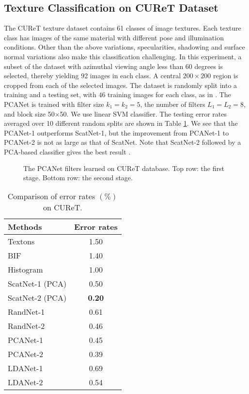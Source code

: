 \documentclass[10pt,journal,compsoc]{IEEEtran}
\begin{document}
\subsection{Texture Classification on CUReT Dataset}
The CUReT texture dataset contains 61 classes of image textures. Each texture class has images of the same material with different pose and illumination conditions. Other than the above variations, specularities, shadowing and surface normal variations also make this classification challenging. In this experiment, a subset of the dataset with azimuthal viewing angle less than 60 degrees is selected, thereby yielding 92 images in each class. A central $200\times 200$ region is cropped from each of the selected images. The dataset is randomly split into a training and a testing set, with $46$ training images for each class, as in \cite{Varma2009}. The PCANet is trained with filter size $k_1 = k_2 = 5$, the number of filters $L_1 = L_2 = 8$, and block size 50$\times$50. We use linear SVM classifier. The testing error rates averaged over 10 different random splits are shown in Table \ref{table: CUReT}. We see that the PCANet-1 outperforms ScatNet-1, but the improvement from PCANet-1 to PCANet-2 is not as large as that of ScatNet. Note that ScatNet-2 followed by a PCA-based classifier gives the best result \cite{Bruna2013}.

\begin{figure}[t]
\centering
{}
\caption{The PCANet filters learned on CUReT database. Top row: the first stage. Bottom row: the second stage. }\label{fig: CUReT_Filters}
\end{figure}

\begin{table}[tbp]\centering
\caption{Comparison of error rates $(\%)$ on CUReT.}
\begin{tabular}{l|c}
  \hline
Methods           & Error rates \\  \hline \hline
  Textons \cite{Hayman2004} & 1.50 \\
  BIF \cite{Crosier2010}  & 1.40 \\
  Histogram \cite{Broadhurst2006} & 1.00 \\
  ScatNet-1 (PCA) \cite{Bruna2013} & 0.50 \\
  ScatNet-2 (PCA) \cite{Bruna2013} & {\bf 0.20} \\ \hline
  RandNet-1  & 0.61 \\
  RandNet-2 & 0.46 \\
  PCANet-1    & 0.45  \\
  PCANet-2    & 0.39 \\
  LDANet-1    & 0.69  \\
  LDANet-2    & 0.54 \\
  \hline
\end{tabular}\label{table: CUReT}
\end{table}
\end{document}
